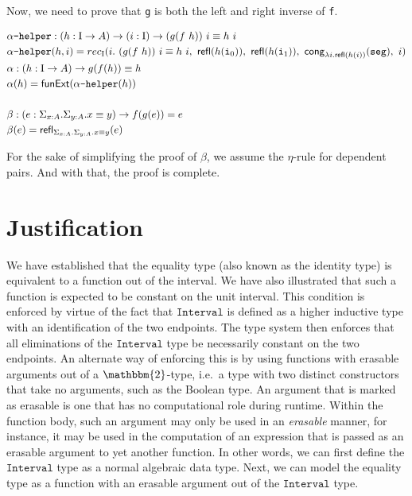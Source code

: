 \documentclass[12pt,twoside,maitrise]{dms}
\theoremstyle{definition}
\numberwithin{equation}{section}
\numberwithin{table}{chapter}
\numberwithin{figure}{chapter}
\newcommand\kw[1] {\textsf{#1}}
\newcommand\id[1] {\texttt{#1}}
\begin{document}
Now, we need to prove that \id{g} is both the left and right inverse of \id{f}.

\begin{align*}
  & \id{$\alpha$-helper} : (\oftype{h}{\bI \rightarrow A}) \rightarrow (\oftype{i}{\bI}) \rightarrow \eqtype{(g (f \ h)) \ i}{h \ i} \\
  & \id{$\alpha$-helper} (h , i) = rec_{\bI}(i . \ \eqtype{(g (f \ h)) \ i}{h \ i}, \ \refl{h(\ileft)}, \ \refl{h(\iright)}, \ \kw{cong}_{\lambda i . \refl{h(i)}}(\id{seg}), \ i) \\
  & \alpha : (\oftype{h}{\bI \rightarrow A}) \rightarrow \eqtype{g(f(h))}{h} \\
  & \alpha(h) =  \kw{funExt} (\id{$\alpha$-helper} (h)) \\ \\
  & \beta :  (\oftype{e}{\Sigma_{\oftype{x}{A}} . \Sigma_{\oftype{y}{A}} . \eqtype{x}{y}}) \rightarrow f(g(e)) = e \\
  & \beta(e) =  \refl{\Sigma_{\oftype{x}{A}} . \Sigma_{\oftype{y}{A}} . \eqtype{x}{y}}{e}
\end{align*}

For the sake of simplifying the proof of $\beta$, we assume the $\eta$-rule for
dependent pairs. And with that, the proof is complete.

\section{Justification}\label{sec:eq-justification}
We have established that the equality type (also known as the identity type) is
equivalent to a function out of the interval. We have also illustrated that such
a function is expected to be constant on the unit interval. This condition is
enforced by virtue of the fact that $\id{Interval}$ is defined as a higher
inductive type\cite{HoTTbook} with an identification of the two endpoints. The
type system then enforces that all eliminations of the $\id{Interval}$ type be
necessarily constant on the two endpoints. An alternate way of enforcing this is
by using functions with erasable arguments out of a $\mathbbm{2}$-type, i.e.\ a
type with two distinct constructors that take no arguments, such as the Boolean
type. An argument that is marked as erasable is one that has no computational
role during runtime. Within the function body, such an argument may only be used
in an \emph{erasable} manner, for instance, it may be used in the computation of
an expression that is passed as an erasable argument to yet another function. In
other words, we can first define the $\id{Interval}$ type as a normal algebraic
data type. Next, we can model the equality type as a function with an erasable
argument out of the $\id{Interval}$ type.
\end{document}
